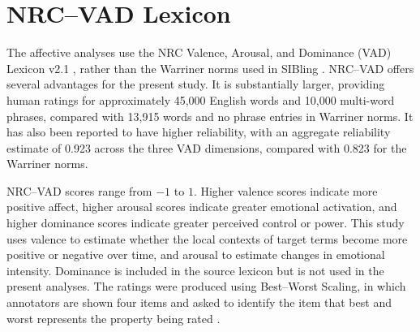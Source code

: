\section{NRC--VAD Lexicon}

The affective analyses use the NRC Valence, Arousal, and Dominance (VAD) Lexicon v2.1 \citep{mohammadNRCVADLexicon2025}, rather than the Warriner norms used in SIBling \citep{baesMultidimensionalFrameworkEvaluating2024}. NRC--VAD offers several advantages for the present study. It is substantially larger, providing human ratings for approximately 45,000 English words and 10,000 multi-word phrases, compared with 13,915 words and no phrase entries in Warriner norms. It has also been reported to have higher reliability, with an aggregate reliability estimate of 0.923 across the three VAD dimensions, compared with 0.823 for the Warriner norms.

NRC--VAD scores range from \(-1\) to \(1\). Higher valence scores indicate more positive affect, higher arousal scores indicate greater emotional activation, and higher dominance scores indicate greater perceived control or power. This study uses valence to estimate whether the local contexts of target terms become more positive or negative over time, and arousal to estimate changes in emotional intensity. Dominance is included in the source lexicon but is not used in the present analyses. The ratings were produced using Best--Worst Scaling, in which annotators are shown four items and asked to identify the item that best and worst represents the property being rated \citep{mohammadNRCVADLexicon2025}.
